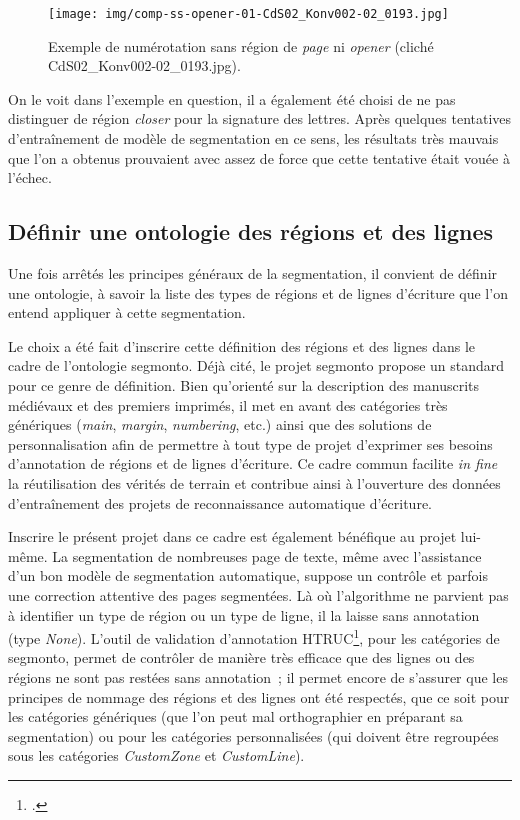 \documentclass[a4paper,12pt,twoside]{book}
\begin{document}
				\begin{figure}[!h]
					\centering
					\texttt{[image: img/comp-ss-opener-01-CdS02\_Konv002-02\_0193.jpg]}
					\caption{Exemple de numérotation sans région de \textit{page} ni \textit{opener} (cliché CdS02\_Konv002-02\_0193.jpg).}
					\label{comp-ss-opener-193}
				\end{figure}
				
				On le voit dans l'exemple en question, il a également été choisi de ne pas distinguer de région \textit{closer} pour la signature des lettres. Après quelques tentatives d'entraînement de modèle de \gls{segmentation} en ce sens, les résultats très mauvais que l'on a obtenus prouvaient avec assez de force que cette tentative était vouée à l'échec.
				
			\subsection{Définir une ontologie des régions et des lignes}
				Une fois arrêtés les principes généraux de la \gls{segmentation}, il convient de définir une ontologie, à savoir la liste des types de régions et de lignes d'écriture que l'on entend appliquer à cette \gls{segmentation}.
				
				Le choix a été fait d'inscrire cette définition des régions et des lignes dans le cadre de l'ontologie \gls{segmonto}. Déjà cité, le projet \gls{segmonto} propose un standard pour ce genre de définition. Bien qu'orienté sur la description des manuscrits médiévaux et des premiers imprimés, il met en avant des catégories très génériques (\textit{main}, \textit{margin}, \textit{numbering}, etc.) ainsi que des solutions de personnalisation afin de permettre à tout type de projet d'exprimer ses besoins d'annotation de régions et de lignes d'écriture. Ce cadre commun facilite \textit{in fine} la réutilisation des vérités de terrain et contribue ainsi à l'ouverture des données d'entraînement des projets de reconnaissance automatique d'écriture.
				
				Inscrire le présent projet dans ce cadre est également bénéfique au projet lui-même. La \gls{segmentation} de nombreuses page de texte, même avec l'assistance d'un bon modèle de \gls{segmentation} automatique, suppose un contrôle et parfois une correction attentive des pages segmentées. Là où l'algorithme ne parvient pas à identifier un type de région ou un type de ligne, il la laisse sans annotation (type \textit{None}). L'outil de validation d'annotation HTRUC\footcite{clericeHTRUCHTRUnitedCatalog2021}, pour les catégories de \gls{segmonto}, permet de contrôler de manière très efficace que des lignes ou des régions ne sont pas restées sans annotation~; il permet encore de s'assurer que les principes de nommage des régions et des lignes ont été respectés, que ce soit pour les catégories génériques (que l'on peut mal orthographier en préparant sa \gls{segmentation}) ou pour les catégories personnalisées (qui doivent être regroupées sous les catégories \textit{CustomZone} et \textit{CustomLine}).
				
\end{document}
